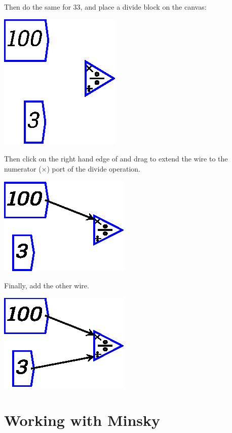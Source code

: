 Then do the same for 33, and place a divide block on the canvas:

\begin{center}
\includegraphics{images/NewItem123.eps}
\end{center}

Then click on the right hand edge of 
and drag to extend the wire to the numerator ($\times$) port of the divide operation.

\begin{center}
\includegraphics{images/wireExample1.eps}
\end{center}

Finally, add the other wire.
\begin{center}
\includegraphics{images/wireExample2.eps}
\end{center}

\section{Working with Minsky}

